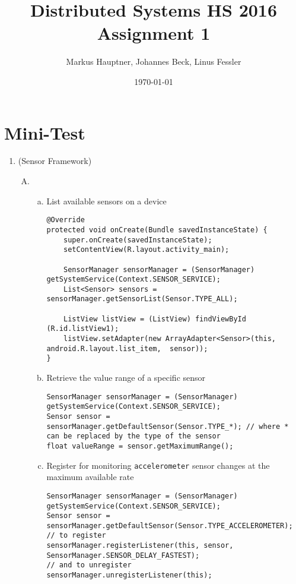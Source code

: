 \documentclass[11pt]{article}
\title{Distributed Systems HS 2016\\Assignment 1}
\author{Markus Hauptner, Johannes Beck, Linus Fessler}
\date{\today}
\begin{document}
\maketitle

\section{Mini-Test}

\begin{enumerate}

\item (Sensor Framework)
\begin{enumerate}[A)]

\item 
\begin{enumerate}[a)]

\item List available sensors on a device
\begin{lstlisting}
@Override
protected void onCreate(Bundle savedInstanceState) {
	super.onCreate(savedInstanceState);
	setContentView(R.layout.activity_main);
	
	SensorManager sensorManager = (SensorManager) getSystemService(Context.SENSOR_SERVICE);
	List<Sensor> sensors = sensorManager.getSensorList(Sensor.TYPE_ALL);
	
	ListView listView = (ListView) findViewById (R.id.listView1);
	listView.setAdapter(new ArrayAdapter<Sensor>(this, android.R.layout.list_item,  sensor));
}
\end{lstlisting}

\item Retrieve the value range of a specific sensor
\begin{lstlisting}
SensorManager sensorManager = (SensorManager) getSystemService(Context.SENSOR_SERVICE);
Sensor sensor = sensorManager.getDefaultSensor(Sensor.TYPE_*); // where * can be replaced by the type of the sensor
float valueRange = sensor.getMaximumRange();
\end{lstlisting}

\item Register for monitoring \lstinline{accelerometer} sensor changes at the maximum available rate
\begin{lstlisting}
SensorManager sensorManager = (SensorManager) getSystemService(Context.SENSOR_SERVICE);
Sensor sensor = sensorManager.getDefaultSensor(Sensor.TYPE_ACCELEROMETER);
// to register
sensorManager.registerListener(this, sensor, SensorManager.SENSOR_DELAY_FASTEST);
// and to unregister
sensorManager.unregisterListener(this);
\end{lstlisting}


\end{enumerate}
\end{enumerate}
\end{enumerate}
\end{document}
